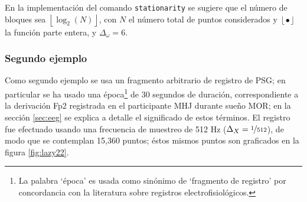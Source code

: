 \documentclass[12pt,letterpaper]{book}
\newcommand{\R}{\mathbb{R}}
\newcommand{\abso}[1]{\left| #1 \right|}
\newcommand{\entero}[1]{\left\lfloor #1 \right\rfloor}
\begin{document}
En la implementación del comando \texttt{stationarity} se sugiere que el número de bloques sea
$\entero{\log_2(N)}$, con $N$ el número total de puntos considerados y $\entero{\bullet}$ la función parte entera, y $\Delta_\omega=6$.

%



\subsubsection*{Segundo ejemplo}

Como segundo ejemplo se usa un fragmento arbitrario de registro de PSG; en particular se ha usado una época\footnote{La palabra `época' es usada como sinónimo de `fragmento de registro' por concordancia con la literatura sobre registros electrofisiológicos.} de 30 segundos de duración, correspondiente a la derivación Fp2 registrada en el participante MHJ durante sueño MOR; en la sección \ref{sec:eeg} se explica a detalle el significado de estos términos.
%
El registro fue efectuado usando una frecuencia de muestreo de 512 Hz ($\Delta_X =\nicefrac{1}{512}$), de modo que se contemplan 15,360 puntos; éstos mismos puntos son graficados en la figura \ref{fig:lazy22}.
\end{document}
